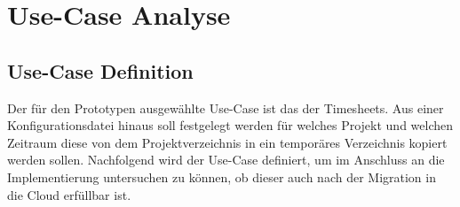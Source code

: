 \section{Use-Case Analyse}


\subsection{Use-Case Definition}
Der für den Prototypen ausgewählte Use-Case ist das \grqq der Timesheets. Aus einer Konfigurationsdatei hinaus soll festgelegt werden für welches Projekt und welchen Zeitraum diese von dem Projektverzeichnis in ein temporäres Verzeichnis kopiert werden sollen. Nachfolgend wird der Use-Case definiert, um im Anschluss an die Implementierung untersuchen zu können, ob dieser auch nach der Migration in die Cloud erfüllbar ist. %
